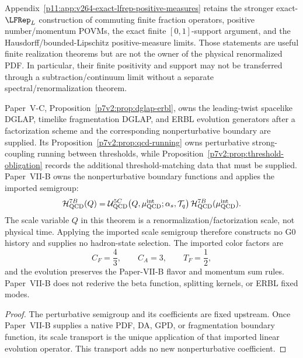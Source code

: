 \documentclass[12pt,a4paper]{article}
\begin{document}
\begin{remark}
\label{p11:rem:v264-optional-finite-positive-measure-branch}
Appendix~\ref{p11:app:v264-exact-lfrep-positive-measures} retains the stronger
exact-\(\LFRep_L\) construction of commuting finite fraction operators, positive
number/momentum POVMs, the exact finite \([0,1]\)-support argument, and the
Hausdorff/bounded-Lipschitz positive-measure limits.  Those statements are
useful finite realization theorems but are not the owner of the physical
renormalized PDF.  In particular, their finite positivity and support may not
be transferred through a subtraction/continuum limit without a separate
spectral/renormalization theorem.
\end{remark}

\begin{theorem}
\label{p11:thm:native-dglap-scale-evolution}
\label{p11:thm:parameter-free-perturbative-qcd-completion}
Paper~V-C, Proposition~\ref{p7v2:prop:dglap-erbl}, owns the leading-twist
spacelike DGLAP, timelike fragmentation DGLAP, and ERBL evolution generators
after a factorization scheme and the corresponding nonperturbative boundary
are supplied.  Its Proposition~\ref{p7v2:prop:qcd-running} owns perturbative
strong-coupling running between thresholds, while
Proposition~\ref{p7v2:prop:threshold-obligation} records the additional
threshold-matching data that must be supplied.  Paper~VII-B owns the
nonperturbative boundary functions and applies the imported semigroup:
\begin{equation}
\label{p11:eq:dglap-equation}
\mathcal H_{\rm QCD}^{7B}(Q)
=\mathcal U_{\rm QCD}^{5C}
\!\left(Q,\mu_{\rm QCD}^{\rm int};\alpha_s,\mathcal T_q\right)
\mathcal H_{\rm QCD}^{7B}(\mu_{\rm QCD}^{\rm int}).
\end{equation}
The scale variable $Q$ in this theorem is a renormalization/factorization
scale, not physical time.  Applying the imported scale semigroup therefore
constructs no G0 history and supplies no hadron-state selection.
The imported color factors are
\begin{equation}
\label{p11:eq:dglap-color-factors}
C_F=\frac43,\qquad C_A=3,\qquad T_F=\frac12,
\end{equation}
and the evolution preserves the Paper-VII-B flavor and momentum sum rules.  Paper~VII-B
does not rederive the beta function, splitting kernels, or ERBL fixed modes.
\end{theorem}
\begin{proof}
The perturbative semigroup and its coefficients are fixed upstream.  Once
Paper~VII-B supplies a native PDF, DA, GPD, or fragmentation boundary function,
its scale transport is the unique application of that imported linear evolution
operator.  This transport adds no new nonperturbative coefficient.
\end{proof}
\end{document}
